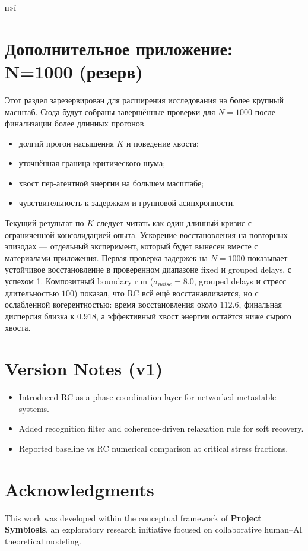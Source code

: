 ﻿п»ї\documentclass[12pt,a4paper]{article}
\begin{document}
\section*{Дополнительное приложение: N=1000 (резерв)}
Этот раздел зарезервирован для расширения исследования на более крупный масштаб. Сюда будут собраны завершённые проверки для $N=1000$ после финализации более длинных прогонов.
\begin{itemize}
    \item долгий прогон насыщения $K$ и поведение хвоста;
    \item уточнённая граница критического шума;
    \item хвост пер-агентной энергии на большем масштабе;
    \item чувствительность к задержкам и групповой асинхронности.
\end{itemize}
Текущий результат по $K$ следует читать как один длинный кризис с ограниченной консолидацией опыта. Ускорение восстановления на повторных эпизодах — отдельный эксперимент, который будет вынесен вместе с материалами приложения.
Первая проверка задержек на $N=1000$ показывает устойчивое восстановление в проверенном диапазоне fixed и grouped delays, с успехом 1.
Композитный boundary run ($\sigma_{noise}=8.0$, grouped delays и стресс длительностью $100$) показал, что RC всё ещё восстанавливается, но с ослабленной когерентностью: время восстановления около $112.6$, финальная дисперсия близка к $0.918$, а эффективный хвост энергии остаётся ниже сырого хвоста.

\section*{Version Notes (v1)}
\begin{itemize}
    \item Introduced RC as a phase-coordination layer for networked metastable systems.
    \item Added recognition filter and coherence-driven relaxation rule for soft recovery.
    \item Reported baseline vs RC numerical comparison at critical stress fractions.
\end{itemize}

\section*{Acknowledgments}
This work was developed within the conceptual framework of \textbf{Project Symbiosis}, an exploratory research initiative focused on collaborative human--AI theoretical modeling.
\end{document}
